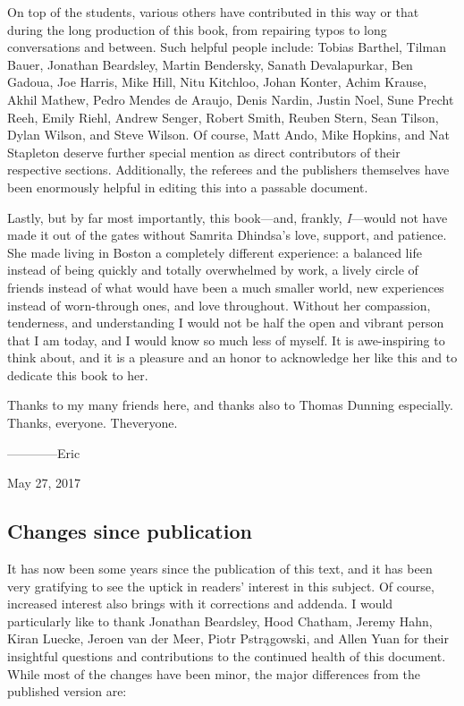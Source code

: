 On top of the students, various others have contributed in this way or that during the long production of this book, from repairing typos to long conversations and between.  Such helpful people include: Tobias Barthel, Tilman Bauer, Jonathan Beardsley, Martin Bendersky, Sanath Devalapurkar, Ben Gadoua, Joe Harris, Mike Hill, Nitu Kitchloo, Johan Konter, Achim Krause, Akhil Mathew, Pedro Mendes de Araujo, Denis Nardin, Justin Noel, Sune Precht Reeh, Emily Riehl, Andrew Senger, Robert Smith, Reuben Stern, Sean Tilson, Dylan Wilson, and Steve Wilson.  Of course, Matt Ando, Mike Hopkins, and Nat Stapleton deserve further special mention as direct contributors of their respective sections.  Additionally, the referees and the publishers themselves have been enormously helpful in editing this into a passable document.

Lastly, but by far most importantly, this book---and, frankly, \emph{I}---would not have made it out of the gates without Samrita Dhindsa's love, support, and patience.  She made living in Boston a completely different experience: a balanced life instead of being quickly and totally overwhelmed by work, a lively circle of friends instead of what would have been a much smaller world, new experiences instead of worn-through ones, and love throughout.  Without her compassion, tenderness, and understanding I would not be half the open and vibrant person that I am today, and I would know so much less of myself.  It is awe-inspiring to think about, and it is a pleasure and an honor to acknowledge her like this and to dedicate this book to her.

Thanks to my many friends here, and thanks also to Thomas Dunning especially.  Thanks, everyone.  Theveryone.

\vspace{2\baselineskip}
\hspace{3em} ------------Eric

\hspace{7em} May 27{\th}, 2017






\cleardoublepage

\subsection*{Changes since publication}

It has now been some years since the publication of this text, and it has been very gratifying to see the uptick in readers' interest in this subject.  Of course, increased interest also brings with it corrections and addenda.  I would particularly like to thank Jonathan Beardsley, Hood Chatham, Jeremy Hahn, Kiran Luecke, Jeroen van der Meer, Piotr Pstr\k{a}gowski, and Allen Yuan for their insightful questions and contributions to the continued health of this document.  While most of the changes have been minor, the major differences from the published version are:

